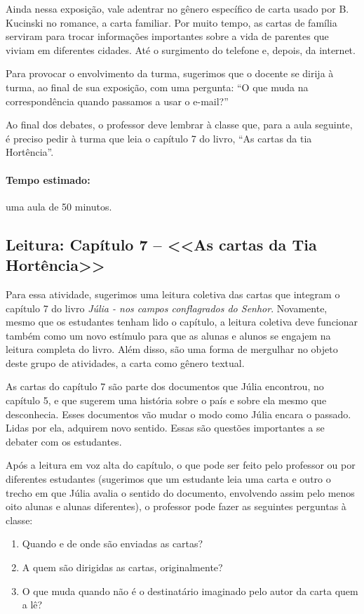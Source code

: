 \documentclass[12pt]{extarticle}
\begin{document}
Ainda nessa exposição, vale adentrar no gênero específico de carta usado
por B. Kucinski no romance, a carta familiar. Por muito tempo, as cartas
de família serviram para trocar informações importantes sobre a vida de
parentes que viviam em diferentes cidades. Até o surgimento do telefone
e, depois, da internet.

Para provocar o envolvimento da turma, sugerimos que o docente se dirija
à turma, ao final de sua exposição, com uma pergunta: ``O que muda na
correspondência quando passamos a usar o e-mail?''

Ao final dos debates, o professor deve lembrar à classe que, para a aula
seguinte, é preciso pedir à turma que leia o capítulo 7 do livro, ``As
cartas da tia Hortência''.

\paragraph{Tempo estimado:} uma aula de 50 minutos.

\subsection{Leitura: Capítulo 7 -- <<As cartas da Tia Hortência>>}

Para essa atividade, sugerimos uma leitura coletiva das cartas que
integram o capítulo 7 do livro \emph{Júlia - nos campos conflagrados do
Senhor}. Novamente, mesmo que os estudantes tenham lido o capítulo, a
leitura coletiva deve funcionar também como um novo estímulo para que as
alunas e alunos se engajem na leitura completa do livro. Além disso, são
uma forma de mergulhar no objeto deste grupo de atividades, a carta como
gênero textual.

As cartas do capítulo 7 são parte dos documentos que Júlia encontrou, no
capítulo 5, e que sugerem uma história sobre o país e sobre ela mesmo
que desconhecia. Esses documentos vão mudar o modo como Júlia encara o
passado. Lidas por ela, adquirem novo sentido. Essas são questões
importantes a se debater com os estudantes.

Após a leitura em voz alta do capítulo, o que pode ser feito pelo
professor ou por diferentes estudantes (sugerimos que um estudante leia
uma carta e outro o trecho em que Júlia avalia o sentido do documento,
envolvendo assim pelo menos oito alunas e alunas diferentes), o
professor pode fazer as seguintes perguntas à classe:

\begin{enumerate}

\item Quando e de onde são enviadas as cartas?

\item A quem são dirigidas as cartas, originalmente?

\item O que muda quando não é o destinatário imaginado pelo autor da carta
  quem a lê?

\end{enumerate}
\end{document}
